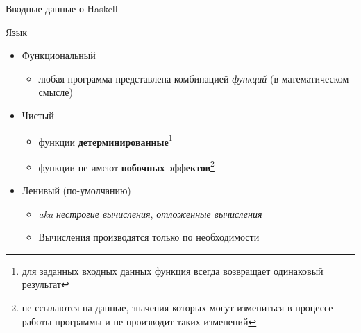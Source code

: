 \documentclass{beamer}
\begin{document}
  \begin{frame}{Вводные данные о Haskell}
      
      \begin{block}{Язык}
          \begin{itemize}
              \item Функциональный
                \begin{itemize}
                    \item любая программа представлена комбинацией \textit{функций} (в математическом смысле)
                \end{itemize}
              \item Чистый
                \begin{itemize}
                    \item функции \textbf{детерминированные}\footnote{для заданных входных данных функция всегда возвращает одинаковый результат}
                    \item функции не имеют \textbf{побочных эффектов}\footnote{не ссылаются на данные, значения которых могут измениться в процессе работы программы и не производит таких изменений}
                \end{itemize}
              \item Ленивый (по-умолчанию)
                \begin{itemize}
                    \item \textit{aka} \textit{нестрогие вычисления}, \textit{отложенные вычисления}
                    \item Вычисления производятся только по необходимости
                \end{itemize}
          \end{itemize}
      \end{block}
  \end{frame}
\end{document}
